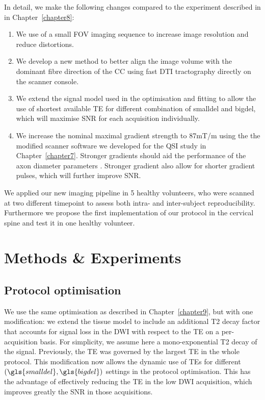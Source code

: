 In detail, we make the following changes compared to the \SFasym{} experiment described in in Chapter~\ref{chapter8}:
\begin{enumerate}
\item We use of a small \gls{FOV} imaging sequence to increase image resolution and reduce distortions.
\item We develop a new method to better align the image volume with the dominant fibre direction of the CC using fast DTI tractography directly on the scanner console.
\item We extend the signal model used in the optimisation and fitting to allow the use of shortest available \gls{TE} for different combination of \gls{smalldel} and \gls{bigdel}, which will maximise SNR for each acquisition individually.
\item We increase the nominal maximal gradient strength to 87mT/m using the the modified scanner software we developed for the QSI study in Chapter~\ref{chapter7}. Stronger gradients should aid the performance of the axon diameter parameters \citep{Dyrby:2010}. Stronger gradient also allow for shorter gradient pulses, which will further improve SNR.
\end{enumerate}
We applied our new imaging pipeline in 5 healthy volunteers, who were scanned at two different timepoint to assess both intra- and inter-subject reproducibility. Furthermore we propose the first implementation of our \SFasym{} protocol in the cervical spine and test it in one healthy volunteer. 


\section{Methods \& Experiments}
\subsection*{Protocol optimisation}
We use the same \SFasym{} optimisation as described in Chapter~\ref{chapter9}, but with one modification: we extend the tissue model to include an additional T2 decay factor that accounts for signal loss in the DWI with respect to the \gls{TE} on a per-acquisition basis. For simplicity, we assume here a mono-exponential T2 decay of the signal. Previously, the \gls{TE} was governed by the largest TE in the whole protocol. This modification now allows the dynamic use of \glspl{TE} for different $(\gls{smalldel},\gls{bigdel})$ settings in the protocol optimisation. This has the advantage of effectively reducing the \gls{TE} in the low DWI acquisition, which improves greatly the SNR in those acquisitions.

